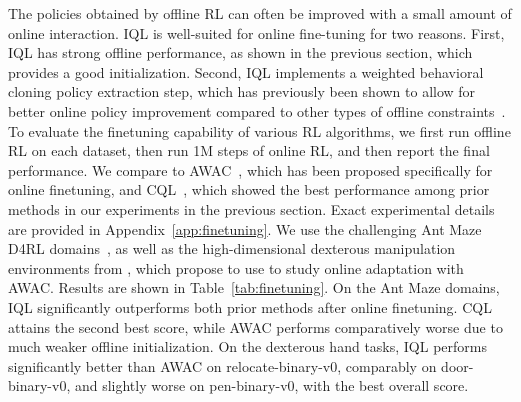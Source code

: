 \documentclass{article} %
\def\ourname{IQL\xspace}
\begin{document}
The policies obtained by offline RL can often be improved with a small amount of online interaction.
\ourname is well-suited for online fine-tuning for two reasons.
First, \ourname has strong offline performance, as shown in the previous section, which provides a good initialization.
Second, \ourname implements a weighted behavioral cloning policy extraction step,
which has previously been shown to allow for better online policy improvement compared to other types of offline constraints~\citep{nair2020awac}.
To evaluate the finetuning capability of various RL algorithms, we first run offline RL on each dataset, then run 1M steps of online RL, and then report the final performance.
We compare to AWAC~\citep{nair2020awac}, which has been proposed specifically for online finetuning, and CQL~\citep{kumar2020conservative}, which showed the best performance among prior methods in our experiments in the previous section. Exact experimental details are provided in Appendix~\ref{app:finetuning}. We use the challenging Ant Maze D4RL domains~\citep{fu2020d4rl}, as well as the high-dimensional dexterous manipulation environments from \citet{rajeswaran2018dextrous}, which \citet{nair2020awac} propose to use to study online adaptation with AWAC. Results are shown in Table~\ref{tab:finetuning}. 
On the Ant Maze domains, \ourname significantly outperforms both prior methods after online finetuning. CQL attains the second best score, while AWAC performs comparatively worse due to much weaker offline initialization. On the dexterous hand tasks, \ourname performs significantly better than AWAC on relocate-binary-v0, comparably on door-binary-v0, and slightly worse on pen-binary-v0, with the best overall score.
\end{document}
